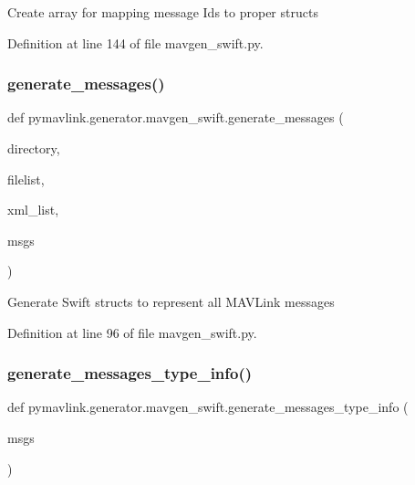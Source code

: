\begin{DoxyVerb}Create array for mapping message Ids to proper structs\end{DoxyVerb}
 

Definition at line 144 of file mavgen\+\_\+swift.\+py.

\mbox{\label{namespacepymavlink_1_1generator_1_1mavgen__swift_a68339c0dfb0acc49c8dbfa99be213de0}} 
\subsubsection{\texorpdfstring{generate\_messages()}{generate\_messages()}}
{\footnotesize\ttfamily def pymavlink.\+generator.\+mavgen\+\_\+swift.\+generate\+\_\+messages (\begin{DoxyParamCaption}\item[{}]{directory,  }\item[{}]{filelist,  }\item[{}]{xml\+\_\+list,  }\item[{}]{msgs }\end{DoxyParamCaption})}

\begin{DoxyVerb}Generate Swift structs to represent all MAVLink messages\end{DoxyVerb}
 

Definition at line 96 of file mavgen\+\_\+swift.\+py.

\mbox{\label{namespacepymavlink_1_1generator_1_1mavgen__swift_ab22d92a382854b7dfe92145f9efc184a}} 
\subsubsection{\texorpdfstring{generate\_messages\_type\_info()}{generate\_messages\_type\_info()}}
{\footnotesize\ttfamily def pymavlink.\+generator.\+mavgen\+\_\+swift.\+generate\+\_\+messages\+\_\+type\+\_\+info (\begin{DoxyParamCaption}\item[{}]{msgs }\end{DoxyParamCaption})}

